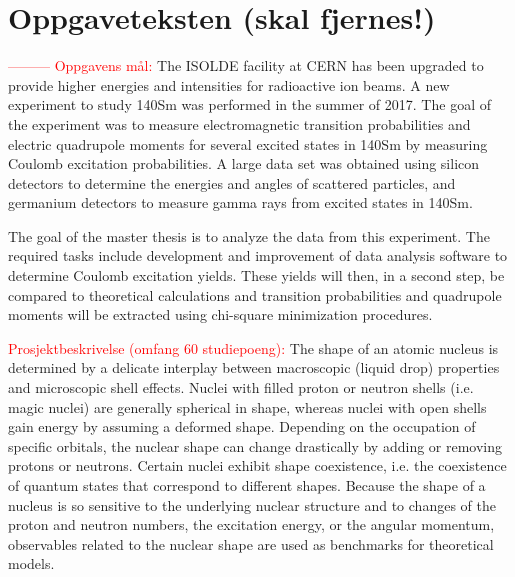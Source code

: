 \documentclass[twoside,english]{uiofysmaster/uiofysmaster}
\begin{document}
\section{Oppgaveteksten (skal fjernes!)}
\textcolor{red}{---------} \newline
\textcolor{red}{Oppgavens mål:} \newline
The ISOLDE facility at CERN has been upgraded to provide higher energies and intensities for radioactive ion beams. A new experiment to study 140Sm was performed in the summer of 2017. The goal of the experiment was to measure electromagnetic transition probabilities and electric quadrupole moments for several excited states in 140Sm by measuring Coulomb excitation probabilities. A large data set was obtained using silicon detectors to determine the energies and angles of scattered particles, and germanium detectors to measure gamma rays from excited states in 140Sm. \newline

The goal of the master thesis is to analyze the data from this experiment. The required tasks include development and improvement of data analysis software to determine Coulomb excitation yields. These yields will then, in a second step, be compared to theoretical calculations and transition probabilities and quadrupole moments will be extracted using chi-square minimization procedures. \newline


\textcolor{red}{Prosjektbeskrivelse (omfang 60 studiepoeng):} \newline
The shape of an atomic nucleus is determined by a delicate interplay between macroscopic (liquid drop) properties and microscopic shell effects. Nuclei with filled proton or neutron shells (i.e. magic nuclei) are generally spherical in shape, whereas nuclei with open shells gain energy by assuming a deformed shape. Depending on the occupation of specific orbitals, the nuclear shape can change drastically by adding or removing protons or neutrons. Certain nuclei exhibit shape coexistence, i.e. the coexistence of quantum states that correspond to different shapes. Because the shape of a nucleus is so sensitive to the underlying nuclear structure and to changes of the proton and neutron numbers, the excitation energy, or the angular momentum, observables related to the nuclear shape are used as benchmarks for theoretical models. 
\end{document}
